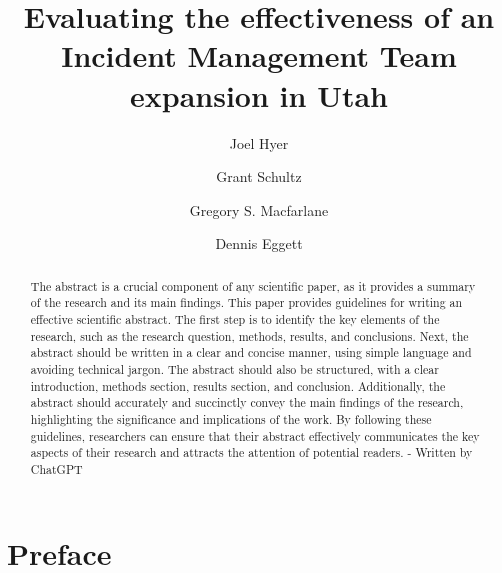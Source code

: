 \documentclass[
  letterpaper,
  authoryear]{elsarticle}
\begin{document}
\begin{frontmatter}
\title{Evaluating the effectiveness of an Incident Management Team
expansion in Utah}
\author[1]{Joel Hyer%
%
}

\author[1]{Grant Schultz%
%
}

\author[1]{Gregory S. Macfarlane%
%
}
\author[2]{Dennis Eggett%
%
}







        
\begin{abstract}
The abstract is a crucial component of any scientific paper, as it
provides a summary of the research and its main findings. This paper
provides guidelines for writing an effective scientific abstract. The
first step is to identify the key elements of the research, such as the
research question, methods, results, and conclusions. Next, the abstract
should be written in a clear and concise manner, using simple language
and avoiding technical jargon. The abstract should also be structured,
with a clear introduction, methods section, results section, and
conclusion. Additionally, the abstract should accurately and succinctly
convey the main findings of the research, highlighting the significance
and implications of the work. By following these guidelines, researchers
can ensure that their abstract effectively communicates the key aspects
of their research and attracts the attention of potential readers. -
Written by ChatGPT
\end{abstract}





\end{frontmatter}
    

\section*{Preface}\label{preface}

\end{document}
